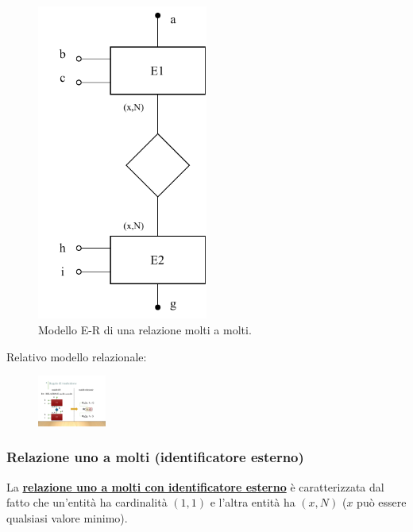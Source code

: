 \documentclass[a4paper]{article}
\begin{document}
	\begin{figure}[!htp]
		\centering
		\includegraphics[width=0.5\textwidth]{img/relazionale_molti_a_molti.pdf}
		\caption{Modello E-R di una relazione molti a molti.}
	\end{figure}
	
	\noindent
	Relativo modello relazionale:
	
	\begin{figure}[!htp]
		\centering
		\includegraphics[width=0.2\textwidth]{img/relazionale_molti_a_molti2.pdf}
	\end{figure}

	\newpage
	
	\subsubsection{Relazione uno a molti (identificatore esterno)}
	
	La \textcolor{Red3}{\textbf{\underline{relazione uno a molti con identificatore esterno}}} è caratterizzata dal fatto che un'entità ha cardinalità $\left(1,1\right)$ e l'altra entità ha $\left(x,N\right)$ ($x$ può essere qualsiasi valore minimo).
	
\end{document}
